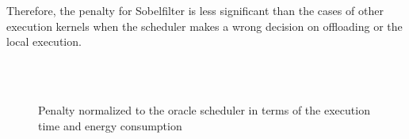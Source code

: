 \documentclass[10pt, conference, compsocconf]{IEEEtran}
\begin{document}
%
Therefore, the penalty for Sobelfilter is less significant than the
cases of other execution kernels when the scheduler makes a wrong
decision on offloading or the local execution.
%
\begin{figure}
	\centering
		\\ 
		\\
	\caption{Penalty normalized to the oracle scheduler in terms of
the execution time and energy consumption}
\end{figure}
%
\end{document}
